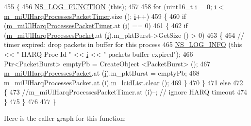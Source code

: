 \begin{DoxyCode}
455 \{
456   \hyperlink{log-macros-disabled_8h_a90b90d5bad1f39cb1b64923ea94c0761}{NS\_LOG\_FUNCTION} (\textcolor{keyword}{this});
457 
458   \textcolor{keywordflow}{for} (uint16\_t \hyperlink{bernuolliDistribution_8m_a6f6ccfcf58b31cb6412107d9d5281426}{i} = 0; \hyperlink{bernuolliDistribution_8m_a6f6ccfcf58b31cb6412107d9d5281426}{i} < \hyperlink{classns3_1_1MmWaveUeMac_af9a65e100f7b9a8e336a40107bfe3844}{m\_miUlHarqProcessesPacketTimer}.size (); 
      \hyperlink{bernuolliDistribution_8m_a6f6ccfcf58b31cb6412107d9d5281426}{i}++)
459     \{
460       \textcolor{keywordflow}{if} (\hyperlink{classns3_1_1MmWaveUeMac_af9a65e100f7b9a8e336a40107bfe3844}{m\_miUlHarqProcessesPacketTimer}.at (\hyperlink{bernuolliDistribution_8m_a6f6ccfcf58b31cb6412107d9d5281426}{i}) == 0)
461         \{
462           \textcolor{keywordflow}{if} (\hyperlink{classns3_1_1MmWaveUeMac_a53afd2059b620c2f3dd1d9791c4df83c}{m\_miUlHarqProcessesPacket}.at (\hyperlink{bernuolliDistribution_8m_a6f6ccfcf58b31cb6412107d9d5281426}{i}).m\_pktBurst->GetSize () > 0)
463             \{
464               \textcolor{comment}{// timer expired: drop packets in buffer for this process}
465               \hyperlink{group__logging_gafbd73ee2cf9f26b319f49086d8e860fb}{NS\_LOG\_INFO} (\textcolor{keyword}{this} << \textcolor{stringliteral}{" HARQ Proc Id "} << \hyperlink{bernuolliDistribution_8m_a6f6ccfcf58b31cb6412107d9d5281426}{i} << \textcolor{stringliteral}{" packets buffer expired"});
466               Ptr<PacketBurst> emptyPb = CreateObject <PacketBurst> ();
467               \hyperlink{classns3_1_1MmWaveUeMac_a53afd2059b620c2f3dd1d9791c4df83c}{m\_miUlHarqProcessesPacket}.at (\hyperlink{bernuolliDistribution_8m_a6f6ccfcf58b31cb6412107d9d5281426}{i}).m\_pktBurst = emptyPb;
468               \hyperlink{classns3_1_1MmWaveUeMac_a53afd2059b620c2f3dd1d9791c4df83c}{m\_miUlHarqProcessesPacket}.at (\hyperlink{bernuolliDistribution_8m_a6f6ccfcf58b31cb6412107d9d5281426}{i}).m\_lcidList.clear ();
469             \}
470         \}
471       \textcolor{keywordflow}{else}
472         \{
473           \textcolor{comment}{//m\_miUlHarqProcessesPacketTimer.at (i)--;  // ignore HARQ timeout}
474         \}
475     \}
476 
477 \}
\end{DoxyCode}


Here is the caller graph for this function\+:


